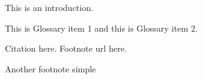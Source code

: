 
This is an introduction.

This is \gls{Glossary item 1} and this is \gls{Glossary item 2}.

Citation here\cite{Li2019}. Footnote url here.

Another footnote simple 